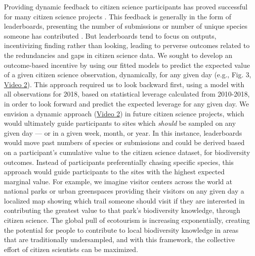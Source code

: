 \documentclass[9pt,twocolumn,twoside,lineno]{pnas-new}
\begin{document}
Providing dynamic feedback to citizen science participants has proved successful for many citizen science projects \cite{rowley2019frogid, wiggins2011conservation, xue2016avicaching}. This feedback is generally in the form of leaderboards, presenting the number of submissions or number of unique species someone has contributed \cite{wood2011ebird}. But leaderboards tend to focus on outputs, incentivizing finding rather than looking, leading to perverse outcomes related to the redundancies and gaps in citizen science data. We sought to develop an outcome-based incentive by using our fitted models to predict the expected value of a given citizen science observation, dynamically, for any given day (e.g., Fig. 3, \href{https://github.com/coreytcallaghan/optimize_citizen_science_obs/blob/master/Figures/dynamic_map.gif}{Video 2}). This approach required us to look backward first, using a model with all observations for 2018, based on statistical leverage calculated from 2010-2018, in order to look forward and predict the expected leverage for any given day. We envision a dynamic approach (\href{https://github.com/coreytcallaghan/optimize_citizen_science_obs/blob/master/Figures/dynamic_map.gif}{Video 2}) in future citizen science projects, which would ultimately guide participants to sites which \textit{should} be sampled on any given day --- or in a given week, month, or year. In this instance, leaderboards would move past numbers of species or submissions and could be derived based on a participant's cumulative value to the citizen science dataset, for biodiversity outcomes. Instead of participants preferentially chasing specific species, this approach would guide participants to the sites with the highest expected marginal value. For example, we imagine visitor centers across the world at national parks or urban greenspaces providing their visitors on any given day a localized map showing which trail someone should visit if they are interested in contributing the greatest value to that park's biodiversity knowledge, through citizen science. The global pull of ecotourism \cite{sharpley2006ecotourism} is increasing exponentially, creating the potential for people to contribute to local biodiversity knowledge in areas that are traditionally undersampled, and with this framework, the collective effort of citizen scientists can be maximized.
\end{document}
